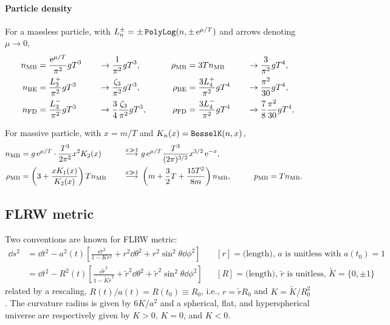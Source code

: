 \documentclass[CheatSheet]{subfiles}
\begin{document}
\paragraph{Particle density}For a massless particle, with $L^\pm_n=\pm\mathop{\text{\texttt{PolyLog}}}(n,\pm\mathop{}\!\mathrm{e}^{\mu/T})$ and arrows denoting $\mu\to0$,
\begin{alignat}{4}
 n_{\text{MB}}    &=\frac{\mathop{}\!\mathrm{e}^{\mu/T}}{\pi^2}gT^3 &\quad&\to\frac{1}{\pi^2}gT^3,&\qquad
 \rho_{\text{MB}} &=3Tn_{\text{MB}}&\quad& \to \frac{3}{\pi^2}gT^4,\\
 n_{\text{BE}}&=\frac{L^+_3}{\pi^2}gT^3 &&\to \frac{\zeta_3}{\pi^2}gT^3,&
 \rho_{\text{BE}}&=\frac{3L^+_4}{\pi^2}gT^4&&\to\frac{\pi^2}{30}gT^4,\\
 n_{\text{FD}}&=\frac{L^-_3}{\pi^2}gT^3&&\to\frac34\frac{\zeta_3}{\pi^2}gT^3,&
 \rho_{\text{FD}}&=\frac{3L^-_4}{\pi^2}gT^4&&\to\frac78\frac{\pi^2}{30}gT^4,
\end{alignat}

For massive particle, with $x=m/T$ and $K_n(x)=\mathop{\text{\texttt{BesselK}}}(n,x)$,
\begin{alignat}{3}
 n_{\text{MB}}&=g\mathop{}\!\mathrm{e}^{\mu/T}\cdot\frac{T^3}{2\pi^2}x^2K_2(x)\qquad
&\stackrel{x\gg1}\longrightarrow&~
g\mathop{}\!\mathrm{e}^{\mu/T}\frac{T^3}{(2\pi)^{3/2}}x^{3/2}\mathop{}\!\mathrm{e}^{-x},\\
\rho_{\text{MB}}&=\left(3+\frac{xK_1(x)}{K_2(x)}\right)Tn_{\text{MB}}
&\stackrel{x\gg1}\longrightarrow&~
\left(m+\frac{3}{2}T+\frac{15T^2}{8m}\right)n_{\text{MB}},\qquad&
 p_{\text{MB}}&=T n_{\text{MB}}.
\end{alignat}


\detailstyle

\clearpage

\subsection{FLRW metric}
Two conventions are known for FLRW  metric:
\begin{align}
  \dd s^2
&= \dd t^2-a^2(t)\left[\frac{\dd r^2}{1- K r^2}+ r^2\dd\theta^2+ r^2\sin^2\theta\dd\phi^2\right]
&&\text{$[r]=\text{(length)}$, $a$ is unitless with $a(t_0)=1$}
\\
&= \dd t^2-R^2(t)\left[\frac{\dd \tilde r^2}{1-\tilde K \tilde r^2}+\tilde r^2\dd\theta^2+\tilde r^2\sin^2\theta\dd\phi^2\right]
&&\text{$[R]=\text{(length)}$, $\tilde r$ is unitless, $\tilde K=\{0,\pm1\}$}
\end{align}
related by a rescaling, $R(t)/a(t)=R(t_0)\equiv R_0$, i.e., 
$r = \tilde r R_0$ and $K = \tilde K/R_0^2$.
The curvature radius is given by $6K/a^2$ and a spherical, flat, and hyperspherical universe are respectively given by $K>0$, $K=0$, and $K<0$.
\end{document}
